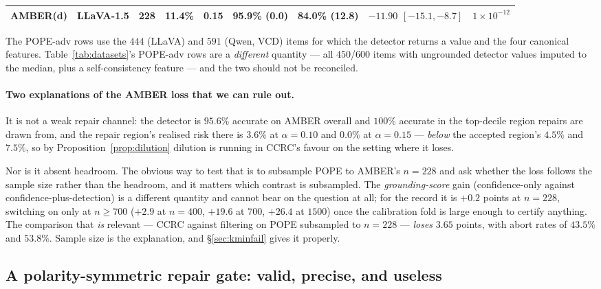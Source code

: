 \documentclass[review,number,doubleblind]{elsarticle}
\theoremstyle{plain}
\theoremstyle{definition}
\theoremstyle{remark}
\begin{document}
\begin{table}[t]
{\begin{threeparttable}
\begin{tabular}{llccccccc}
AMBER(d) & LLaVA-1.5   & 228  & 11.4\% & 0.15 & \textbf{95.9\%} (0.0) & 84.0\% (\textbf{12.8}) & $-11.90$ $[-15.1,-8.7]$ & $1\!\times\!10^{-12}$\\
\bottomrule
\end{tabular}
\begin{tablenotes}[flushleft]\footnotesize
\item The POPE-adv rows use the $444$ (LLaVA) and $591$ (Qwen, VCD) items for which the detector
returns a value and the four canonical features. Table~\ref{tab:datasets}'s POPE-adv rows are a
\emph{different} quantity --- all $450$/$600$ items with ungrounded detector values imputed to the
median, plus a self-consistency feature --- and the two should not be reconciled.
\end{tablenotes}
\end{threeparttable}
}
\end{table}

\paragraph{Two explanations of the AMBER loss that we can rule out.}
It is not a weak repair channel: the detector is $95.6\%$ accurate on AMBER overall and $100\%$
accurate in the top-decile region repairs are drawn from, and the repair region's realised risk
there is $3.6\%$ at $\alpha=0.10$ and $0.0\%$ at $\alpha=0.15$ --- \emph{below} the accepted
region's $4.5\%$ and $7.5\%$, so by Proposition~\ref{prop:dilution} dilution is running in
CCRC's favour on the setting where it loses.

Nor is it absent headroom. The obvious way to test that is to subsample POPE to AMBER's
$n=228$ and ask whether the loss follows the sample size rather than the headroom, and it
matters which contrast is subsampled. The \emph{grounding-score} gain (confidence-only against
confidence-plus-detection) is a different quantity and cannot bear on the question at all; for
the record it is $+0.2$ points at $n=228$, switching on only at $n\ge700$ ($+2.9$ at $n=400$,
$+19.6$ at $700$, $+26.4$ at $1500$) once the calibration fold is large enough to certify
anything. The comparison that \emph{is} relevant --- CCRC against filtering on POPE subsampled
to $n=228$ --- \emph{loses} $3.65$ points, with abort rates of $43.5\%$ and $53.8\%$. Sample
size is the explanation, and \S\ref{sec:kminfail} gives it properly.

\subsection{A polarity-symmetric repair gate: valid, precise, and useless}
\label{sec:symgate}
\end{document}
